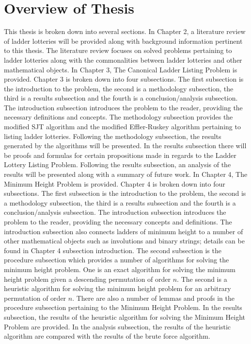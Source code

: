 \section{Overview of Thesis}
This thesis is broken down into several sections. In Chapter 2, a literature
review of ladder lotteries will be provided along with background information pertinent to this thesis. 
The literature review focuses on solved problems pertaining 
to ladder lotteries along with the commonalities between ladder lotteries and 
other mathematical objects. In Chapter 3, The Canonical Ladder Listing Problem is provided. 
Chapter 3 is broken down into four subsections. The first subsection is the introduction to the problem, 
the second is a methodology subsection, the third is a results 
subsection and the fourth is a conclusion/analysis subsection. The introduction subsection introduces the problem to the reader, providing the necessary 
definitions and concepts. The methodology subsection provides the modified SJT algorithm and the modified Effler-Ruskey algorithm pertaining 
to listing ladder lotteries. 
Following the methodology subsection, the results generated by the algorithms will be presented.
In the results subsection there will be proofs and formulas for certain propositions made in regards to the Ladder Lottery Listing Problem. 
Following the results subsection, an analysis of the results will be presented along with a summary of future work. 
In Chapter 4, The Minimum Height Problem is provided. Chapter 4 is broken down into four subsections.
The first subsection is the introduction to the problem, 
the second is a methodology subsection, the third is a results 
subsection and the fourth is a conclusion/analysis subsection.
The introduction subsection introduces the problem to the reader, providing the necessary concepts and definitions. The 
introduction subsection also connects ladders of minimum height to a number of other mathematical objects such as 
involutions and binary strings; details can be found in Chapter 4 subsection introduction. The second subsection 
is the procedure subsection which provides a number of algorithms for solving the minimum height problem. One is an exact 
algorithm for solving the minimum height problem given a descending permutation of order $n$. The second is a heuristic 
algorithm for solving the minimum height problem for an arbitrary permutation of order $n$. There are also a number 
of lemmas and proofs in the procedure subsection pertaining to the Minimum Height Problem. In the results subsection, 
the results of the heuristic algorithm for solving the Minimum 
Height Problem are provided. In the analysis subsection, the results of the heuristic algorithm are compared with the results of the brute 
force algorithm. 

